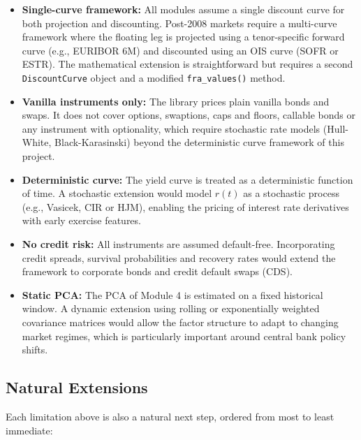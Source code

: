 \documentclass{article}
\theoremstyle{definition}  %
\theoremstyle{plain}  %
\numberwithin{definition}{section}
\numberwithin{proposition}{section}
\numberwithin{theorem}{section}
\numberwithin{equation}{section}
\begin{document}
\begin{itemize}
    \item \textbf{Single-curve framework:} All modules assume a single discount curve for both projection and discounting. Post-2008 markets require a multi-curve 
    framework where the floating leg is projected using a tenor-specific forward curve (e.g., EURIBOR 6M) and discounted using an OIS curve (SOFR or ESTR). The mathematical extension is straightforward but requires a second \texttt{DiscountCurve} object and a modified \texttt{fra\_values()} method.
    
    \item \textbf{Vanilla instruments only:} The library prices plain vanilla bonds and swaps. It does not cover options, swaptions, caps and floors, callable bonds or any instrument with optionality, which require stochastic rate models (Hull-White, Black-Karasinski) beyond the deterministic curve framework of this project.
    
    \item \textbf{Deterministic curve:} The yield curve is treated as a deterministic function of time. A stochastic extension would model $r(t)$ as a stochastic process (e.g., Vasicek, CIR or HJM), enabling the pricing of interest rate derivatives with early exercise features.
    
    \item \textbf{No credit risk:} All instruments are assumed default-free. Incorporating credit spreads, survival probabilities and recovery rates would extend the framework to corporate bonds and credit default swaps (CDS).
    
    \item \textbf{Static PCA:} The PCA of Module 4 is estimated on a fixed historical window. A dynamic extension using rolling or exponentially weighted covariance matrices would allow the factor structure to adapt to changing market regimes, which is particularly important around central bank policy shifts.
\end{itemize}

\subsection*{Natural Extensions}

Each limitation above is also a natural next step, ordered from most to least immediate:
\end{document}
